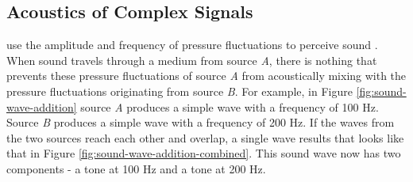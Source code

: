 \DIFdelbegin %
\DIFdelend \DIFaddbegin \subsection{Acoustics of Complex Signals}
\DIFaddend 

\DIFdelbegin {}\DIFdelend \DIFaddbegin {}\DIFaddend use the amplitude and frequency of pressure fluctuations to perceive sound \DIFaddbegin {}\DIFaddend . When sound travels through a medium from source \textit{A}, there is nothing that prevents these pressure fluctuations of source \textit{A} from acoustically mixing with the pressure fluctuations originating from source \textit{B}.  For example, in Figure \ref{fig:sound-wave-addition} source \textit{A} produces a simple wave with a frequency of 100 Hz.  Source \textit{B} produces a simple wave with a frequency of 200 Hz.  If the waves from the two sources reach each other and overlap, a single wave results that looks like that in Figure \ref{fig:sound-wave-addition-combined}.  This sound wave now has two components - a tone at 100 Hz and a tone at 200 Hz.


